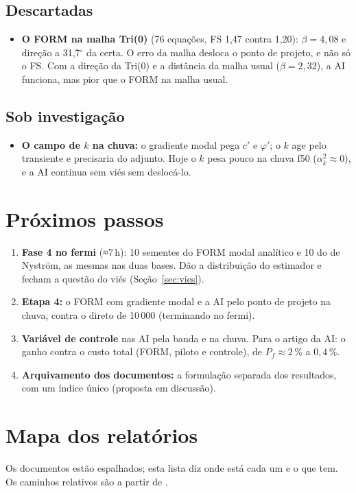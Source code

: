 \documentclass[11pt,a4paper]{article}
\begin{document}
\subsection*{Descartadas}
\begin{itemize}
  \item \textbf{O FORM na malha Tri(0)} (76 equações, FS 1,47 contra 1,20): $\beta = 4{,}08$ e direção a 31,7$^\circ$ da
    certa. O erro da malha desloca o ponto de projeto, e não só o FS. Com a direção da Tri(0) e a distância da malha usual
    ($\beta = 2{,}32$), a AI funciona, mas pior que o FORM na malha usual.
\end{itemize}
\subsection*{Sob investigação}
\begin{itemize}
  \item \textbf{O campo de $k$ na chuva:} o gradiente modal pega $c'$ e $\varphi'$; o $k$ age pelo transiente e
    precisaria do adjunto. Hoje o $k$ pesa pouco na chuva f50 ($\alpha^2_k \approx 0$), e a AI continua sem viés sem
    deslocá-lo.
\end{itemize}

\section{Próximos passos}
\begin{enumerate}
  \item \textbf{Fase 4 no fermi} (≈7\,h): 10 sementes do FORM modal analítico e 10 do de Nyström, as mesmas nas duas
    bases. Dão a distribuição do estimador e fecham a questão do viés (Seção~\ref{sec:vies}).
  \item \textbf{Etapa 4:} o FORM com gradiente modal e a AI pelo ponto de projeto na chuva, contra o direto de 10\,000
    (terminando no fermi).
  \item \textbf{Variável de controle} nas AI pela banda e na chuva. Para o artigo da AI: o ganho contra o custo total
    (FORM, piloto e controle), de $P_f \approx 2\,\%$ a $0{,}4\,\%$.
  \item \textbf{Arquivamento dos documentos:} a formulação separada dos resultados, com um índice único (proposta em
    discussão).
\end{enumerate}

\section{Mapa dos relatórios}\label{sec:mapa}
Os documentos estão espalhados; esta lista diz onde está cada um e o que tem. Os caminhos relativos são a partir de
.
\end{document}
